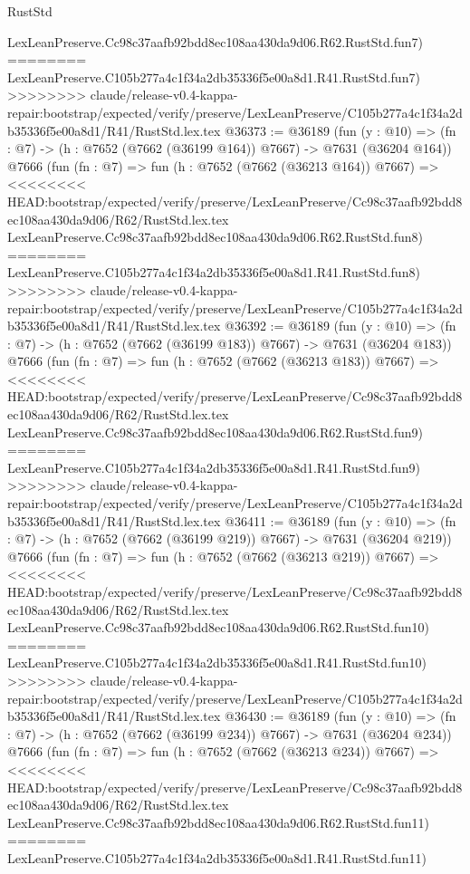 \begin{lexlean}{RustStd}
\begin{coremodule}
{\begin{coremodule}
{{{{{{{{{{{{{{{{{{{{{{{{{{{{{{{{{{{{{{{{{{{{{{{{{{{{{    LexLeanPreserve.Cc98c37aafb92bdd8ec108aa430da9d06.R62.RustStd.fun7)
========
    LexLeanPreserve.C105b277a4c1f34a2db35336f5e00a8d1.R41.RustStd.fun7)
>>>>>>>> claude/release-v0.4-kappa-repair:bootstrap/expected/verify/preserve/LexLeanPreserve/C105b277a4c1f34a2db35336f5e00a8d1/R41/RustStd.lex.tex
@36373 := @36189
    (fun (y : @10) => (fn : @7) -> (h : @7652 (@7662 (@36199 @164)) @7667) -> @7631 (@36204 @164))
    @7666
    (fun (fn : @7) =>
    fun (h : @7652 (@7662 (@36213 @164)) @7667) =>
<<<<<<<< HEAD:bootstrap/expected/verify/preserve/LexLeanPreserve/Cc98c37aafb92bdd8ec108aa430da9d06/R62/RustStd.lex.tex
    LexLeanPreserve.Cc98c37aafb92bdd8ec108aa430da9d06.R62.RustStd.fun8)
========
    LexLeanPreserve.C105b277a4c1f34a2db35336f5e00a8d1.R41.RustStd.fun8)
>>>>>>>> claude/release-v0.4-kappa-repair:bootstrap/expected/verify/preserve/LexLeanPreserve/C105b277a4c1f34a2db35336f5e00a8d1/R41/RustStd.lex.tex
@36392 := @36189
    (fun (y : @10) => (fn : @7) -> (h : @7652 (@7662 (@36199 @183)) @7667) -> @7631 (@36204 @183))
    @7666
    (fun (fn : @7) =>
    fun (h : @7652 (@7662 (@36213 @183)) @7667) =>
<<<<<<<< HEAD:bootstrap/expected/verify/preserve/LexLeanPreserve/Cc98c37aafb92bdd8ec108aa430da9d06/R62/RustStd.lex.tex
    LexLeanPreserve.Cc98c37aafb92bdd8ec108aa430da9d06.R62.RustStd.fun9)
========
    LexLeanPreserve.C105b277a4c1f34a2db35336f5e00a8d1.R41.RustStd.fun9)
>>>>>>>> claude/release-v0.4-kappa-repair:bootstrap/expected/verify/preserve/LexLeanPreserve/C105b277a4c1f34a2db35336f5e00a8d1/R41/RustStd.lex.tex
@36411 := @36189
    (fun (y : @10) => (fn : @7) -> (h : @7652 (@7662 (@36199 @219)) @7667) -> @7631 (@36204 @219))
    @7666
    (fun (fn : @7) =>
    fun (h : @7652 (@7662 (@36213 @219)) @7667) =>
<<<<<<<< HEAD:bootstrap/expected/verify/preserve/LexLeanPreserve/Cc98c37aafb92bdd8ec108aa430da9d06/R62/RustStd.lex.tex
    LexLeanPreserve.Cc98c37aafb92bdd8ec108aa430da9d06.R62.RustStd.fun10)
========
    LexLeanPreserve.C105b277a4c1f34a2db35336f5e00a8d1.R41.RustStd.fun10)
>>>>>>>> claude/release-v0.4-kappa-repair:bootstrap/expected/verify/preserve/LexLeanPreserve/C105b277a4c1f34a2db35336f5e00a8d1/R41/RustStd.lex.tex
@36430 := @36189
    (fun (y : @10) => (fn : @7) -> (h : @7652 (@7662 (@36199 @234)) @7667) -> @7631 (@36204 @234))
    @7666
    (fun (fn : @7) =>
    fun (h : @7652 (@7662 (@36213 @234)) @7667) =>
<<<<<<<< HEAD:bootstrap/expected/verify/preserve/LexLeanPreserve/Cc98c37aafb92bdd8ec108aa430da9d06/R62/RustStd.lex.tex
    LexLeanPreserve.Cc98c37aafb92bdd8ec108aa430da9d06.R62.RustStd.fun11)
========
    LexLeanPreserve.C105b277a4c1f34a2db35336f5e00a8d1.R41.RustStd.fun11)
}}}}}}}}}}}}}}}}}}}}}}}}}}}}}}}}}}}}}}}}}}}}}}}}}}}}}
\end{coremodule}}
\end{coremodule}
\end{lexlean}
